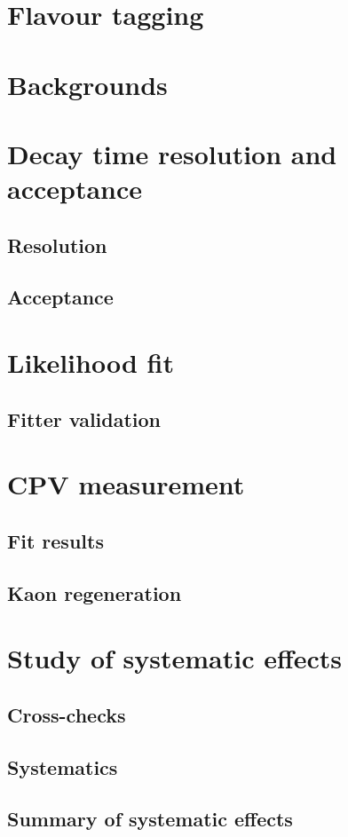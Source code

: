 \section{Flavour tagging}
\section{Backgrounds}
\section{Decay time resolution and acceptance}
\subsection{Resolution}
\subsection{Acceptance}
\section{Likelihood fit}
\subsection{Fitter validation}
\section{CPV measurement}
\subsection{Fit results}
\subsection{Kaon regeneration}
\section{Study of systematic effects}
\subsection{Cross-checks}
\subsection{Systematics}
\subsection{Summary of systematic effects}
